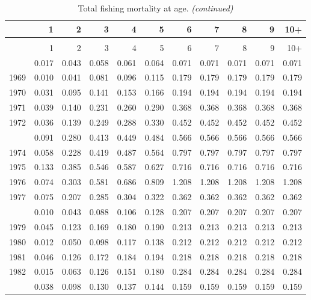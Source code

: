 \documentclass[
]{article}
\begin{document}
\begin{longtable}[t]{lrrrrrrrrrr}
\caption{\label{tab:FAA-tot-table}Total fishing mortality at age.}\\
\toprule
  & 1 & 2 & 3 & 4 & 5 & 6 & 7 & 8 & 9 & 10+\\
\midrule
\endfirsthead
\caption[]{Total fishing mortality at age. \textit{(continued)}}\\
\toprule
  & 1 & 2 & 3 & 4 & 5 & 6 & 7 & 8 & 9 & 10+\\
\midrule
\endhead

\endfoot
\bottomrule
\endlastfoot
1968 & 0.017 & 0.043 & 0.058 & 0.061 & 0.064 & 0.071 & 0.071 & 0.071 & 0.071 & 0.071\\
1969 & 0.010 & 0.041 & 0.081 & 0.096 & 0.115 & 0.179 & 0.179 & 0.179 & 0.179 & 0.179\\
1970 & 0.031 & 0.095 & 0.141 & 0.153 & 0.166 & 0.194 & 0.194 & 0.194 & 0.194 & 0.194\\
1971 & 0.039 & 0.140 & 0.231 & 0.260 & 0.290 & 0.368 & 0.368 & 0.368 & 0.368 & 0.368\\
1972 & 0.036 & 0.139 & 0.249 & 0.288 & 0.330 & 0.452 & 0.452 & 0.452 & 0.452 & 0.452\\
\addlinespace
1973 & 0.091 & 0.280 & 0.413 & 0.449 & 0.484 & 0.566 & 0.566 & 0.566 & 0.566 & 0.566\\
1974 & 0.058 & 0.228 & 0.419 & 0.487 & 0.564 & 0.797 & 0.797 & 0.797 & 0.797 & 0.797\\
1975 & 0.133 & 0.385 & 0.546 & 0.587 & 0.627 & 0.716 & 0.716 & 0.716 & 0.716 & 0.716\\
1976 & 0.074 & 0.303 & 0.581 & 0.686 & 0.809 & 1.208 & 1.208 & 1.208 & 1.208 & 1.208\\
1977 & 0.075 & 0.207 & 0.285 & 0.304 & 0.322 & 0.362 & 0.362 & 0.362 & 0.362 & 0.362\\
\addlinespace
1978 & 0.010 & 0.043 & 0.088 & 0.106 & 0.128 & 0.207 & 0.207 & 0.207 & 0.207 & 0.207\\
1979 & 0.045 & 0.123 & 0.169 & 0.180 & 0.190 & 0.213 & 0.213 & 0.213 & 0.213 & 0.213\\
1980 & 0.012 & 0.050 & 0.098 & 0.117 & 0.138 & 0.212 & 0.212 & 0.212 & 0.212 & 0.212\\
1981 & 0.046 & 0.126 & 0.172 & 0.184 & 0.194 & 0.218 & 0.218 & 0.218 & 0.218 & 0.218\\
1982 & 0.015 & 0.063 & 0.126 & 0.151 & 0.180 & 0.284 & 0.284 & 0.284 & 0.284 & 0.284\\
\addlinespace
1983 & 0.038 & 0.098 & 0.130 & 0.137 & 0.144 & 0.159 & 0.159 & 0.159 & 0.159 & 0.159\\

\end{longtable}
\end{document}

